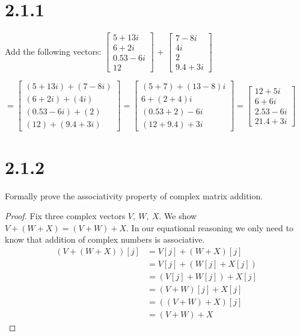 \documentclass[11pt]{article}
\begin{document}
\newpage

\section{2.1.1}
Add the following vectors: 
$\begin{bmatrix} 
	5 + 13i \\
	6 + 2i \\
	0.53 - 6i \\
	12
\end{bmatrix}$
+ 
$\begin{bmatrix} 
	7 - 8i \\
	4i \\
	2 \\
	9.4 + 3i	
\end{bmatrix}$
\vspace{0.2in}

$= 
\begin{bmatrix} 
	(5 + 13i) + (7 - 8i) \\
	(6 + 2i) + (4i) \\
	(0.53 - 6i) + (2) \\
	(12) + (9.4 + 3i)
\end{bmatrix}
=
\begin{bmatrix} 
	(5+7) +  (13 - 8)i \\
	6 + (2+4)i \\
	(0.53+2) - 6i \\
	(12+9.4) + 3i
\end{bmatrix}
=
\begin{bmatrix} 
	12 +  5i \\
	6 + 6i \\
	2.53 - 6i \\
	21.4 + 3i
\end{bmatrix}$




\section{2.1.2}
Formally prove the associativity property of complex matrix addition.
\begin{proof}
	Fix three complex vectors $V,\ W,\ X$. We show $V + (W + X) = (V + W) + X$.
	In our equational reasoning we only need to know that addition of complex numbers is associative.
\begin{align*}
	(V + (W + X))[j] &= V[j] + (W + X)[j]  \\
		        &= V[j] + (W[j] + X[j])   \\
		        &= (V[j] + W[j]) + X[j]  \\
		        &= (V + W)[j] + X[j]  \\
		        &= ((V+W)+X)[j] \\
			&= (V+W) + X
	\end{align*}
\end{proof}
\end{document}
